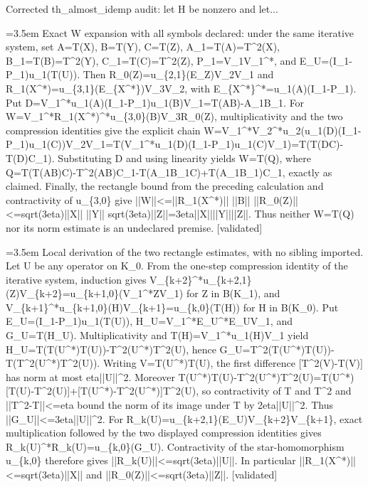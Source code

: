 \documentclass{article}
\newcommand{\step}[1]{\par\noindent\hangindent=3.5em\hangafter=1%
  \makebox[3.5em][l]{\textbf{#1.}}}
\newcommand{\steptag}[1]{\hfill{\small\textsf{[#1]}}}
\begin{document}
\begin{proofbox}{Corrected th\_almost\_idemp audit: let H be nonzero and let...}
\step{1.2.2.3} Exact W expansion with all symbols declared: under the same iterative system, set A=T(X), B=T(Y), C=T(Z), A\_1=T(A)=T\textasciicircum{}2(X), B\_1=T(B)=T\textasciicircum{}2(Y), C\_1=T(C)=T\textasciicircum{}2(Z), P\_1=V\_1V\_1\textasciicircum{}*, and E\_U=(I\_1-P\_1)u\_1(T(U)). Then R\_0(Z)=u\_\{2,1\}(E\_Z)V\_2V\_1 and R\_1(X\textasciicircum{}*)=u\_\{3,1\}(E\_\{X\textasciicircum{}*\})V\_3V\_2, with E\_\{X\textasciicircum{}*\}\textasciicircum{}*=u\_1(A)(I\_1-P\_1). Put D=V\_1\textasciicircum{}*u\_1(A)(I\_1-P\_1)u\_1(B)V\_1=T(AB)-A\_1B\_1. For W=V\_1\textasciicircum{}*R\_1(X\textasciicircum{}*)\textasciicircum{}*u\_\{3,0\}(B)V\_3R\_0(Z), multiplicativity and the two compression identities give the explicit chain W=V\_1\textasciicircum{}*V\_2\textasciicircum{}*u\_2(u\_1(D)(I\_1-P\_1)u\_1(C))V\_2V\_1=T(V\_1\textasciicircum{}*u\_1(D)(I\_1-P\_1)u\_1(C)V\_1)=T(T(DC)-T(D)C\_1). Substituting D and using linearity yields W=T(Q), where Q=T(T(AB)C)-T\textasciicircum{}2(AB)C\_1-T(A\_1B\_1C)+T(A\_1B\_1)C\_1, exactly as claimed. Finally, the rectangle bound from the preceding calculation and contractivity of u\_\{3,0\} give ||W||<=||R\_1(X\textasciicircum{}*)|| ||B|| ||R\_0(Z)||<=sqrt(3eta)||X|| ||Y|| sqrt(3eta)||Z||=3eta||X||||Y||||Z||. Thus neither W=T(Q) nor its norm estimate is an undeclared premise. \steptag{validated} \\[6pt]
\step{1.2.2.3.1} Local derivation of the two rectangle estimates, with no sibling imported. Let U be any operator on K\_0. From the one-step compression identity of the iterative system, induction gives V\_\{k+2\}\textasciicircum{}*u\_\{k+2,1\}(Z)V\_\{k+2\}=u\_\{k+1,0\}(V\_1\textasciicircum{}*ZV\_1) for Z in B(K\_1), and V\_\{k+1\}\textasciicircum{}*u\_\{k+1,0\}(H)V\_\{k+1\}=u\_\{k,0\}(T(H)) for H in B(K\_0). Put E\_U=(I\_1-P\_1)u\_1(T(U)), H\_U=V\_1\textasciicircum{}*E\_U\textasciicircum{}*E\_UV\_1, and G\_U=T(H\_U). Multiplicativity and T(H)=V\_1\textasciicircum{}*u\_1(H)V\_1 yield H\_U=T(T(U\textasciicircum{}*)T(U))-T\textasciicircum{}2(U\textasciicircum{}*)T\textasciicircum{}2(U), hence G\_U=T\textasciicircum{}2(T(U\textasciicircum{}*)T(U))-T(T\textasciicircum{}2(U\textasciicircum{}*)T\textasciicircum{}2(U)). Writing V=T(U\textasciicircum{}*)T(U), the first difference [T\textasciicircum{}2(V)-T(V)] has norm at most eta||U||\textasciicircum{}2. Moreover T(U\textasciicircum{}*)T(U)-T\textasciicircum{}2(U\textasciicircum{}*)T\textasciicircum{}2(U)=T(U\textasciicircum{}*)[T(U)-T\textasciicircum{}2(U)]+[T(U\textasciicircum{}*)-T\textasciicircum{}2(U\textasciicircum{}*)]T\textasciicircum{}2(U), so contractivity of T and T\textasciicircum{}2 and ||T\textasciicircum{}2-T||<=eta bound the norm of its image under T by 2eta||U||\textasciicircum{}2. Thus ||G\_U||<=3eta||U||\textasciicircum{}2. For R\_k(U)=u\_\{k+2,1\}(E\_U)V\_\{k+2\}V\_\{k+1\}, exact multiplication followed by the two displayed compression identities gives R\_k(U)\textasciicircum{}*R\_k(U)=u\_\{k,0\}(G\_U). Contractivity of the star-homomorphism u\_\{k,0\} therefore gives ||R\_k(U)||<=sqrt(3eta)||U||. In particular ||R\_1(X\textasciicircum{}*)||<=sqrt(3eta)||X|| and ||R\_0(Z)||<=sqrt(3eta)||Z||. \steptag{validated} \\[4pt]

\end{proofbox}
\end{document}
